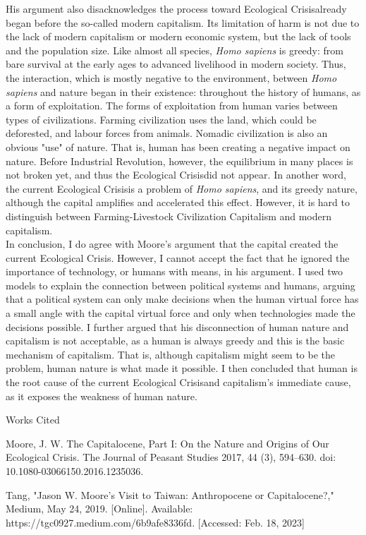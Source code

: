 \documentclass[12pt]{article}
\newcommand{\IR}{Industrial Revolution}
\newcommand{\EC}{Ecological Crisis}
\newcommand{\bibent}{\noindent \hangindent 40pt}
\newenvironment{workscited}{\newpage \begin{center} Works Cited \end{center}}{\newpage }
\begin{document}
\begin{flushleft}
His argument also disacknowledges the process toward \EC already began before the  so-called modern capitalism.
Its limitation of harm is not due to the lack of modern capitalism or modern economic system, but the lack of tools and the population size. 
Like almost all species, \textit{Homo sapiens} is greedy: from bare survival at the early ages to advanced livelihood in modern society. Thus, the interaction, which is mostly negative to the environment, between \textit{Homo sapiens} and nature began in their existence: throughout the history of humans, as a form of exploitation. The forms of exploitation from human varies between types of civilizations. Farming civilization uses the land, which could be deforested, and labour forces from animals. Nomadic civilization is also an obvious "use" of nature. That is, human has been creating a negative impact on nature. Before \IR, however, the equilibrium in many places is not broken yet, and thus the \EC did not appear. In another word, the current \EC is a problem of \textit{Homo sapiens}, and its greedy nature, although the capital amplifies and accelerated this effect. However, it is hard to distinguish between Farming-Livestock Civilization Capitalism and modern capitalism.
\\


In conclusion, I do agree with Moore's argument that the capital created the current \EC. However, I cannot accept the fact that he ignored the importance of technology, or humans with means, in his argument. I used two models to explain the connection between political systems and humans, arguing that a political system can only make decisions when the human virtual force has a small angle with the capital virtual force and only when technologies made the decisions possible. I further argued that his disconnection of human nature and capitalism is not acceptable, as a human is always greedy and this is the basic mechanism of capitalism. That is, although capitalism might seem to be the problem, human nature is what made it possible. I then concluded that human is the root cause of the current \EC and capitalism's immediate cause, as it exposes the weakness of human nature. 
\newpage



\begin{workscited}

\bibent Moore, J. W. The Capitalocene, Part I: On the Nature and Origins of Our Ecological Crisis. The Journal of Peasant Studies 2017, 44 (3), 594–630. doi: 10.1080-03066150.2016.1235036.

\bibent 
 Tang, "Jason W. Moore's Visit to Taiwan: Anthropocene or Capitalocene?," Medium, May 24, 2019. [Online]. Available: https://tgc0927.medium.com/6b9afe8336fd. [Accessed: Feb. 18, 2023]



\end{workscited}

\end{flushleft}
\end{document}
